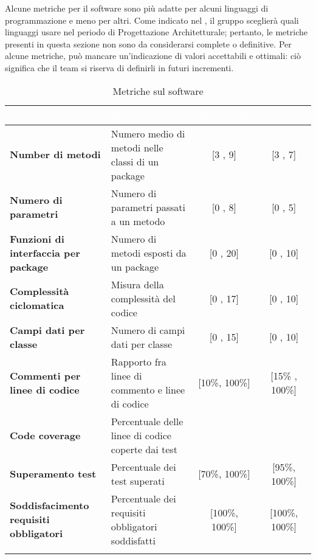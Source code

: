 Alcune metriche per il software sono più adatte per alcuni linguaggi di programmazione e meno per altri. Come indicato nel \PdP , il gruppo \gruppo \space sceglierà quali linguaggi usare nel periodo di Progettazione Architetturale; pertanto, le metriche presenti in questa sezione non sono da considerarsi complete o definitive.\newline
Per alcune metriche, può mancare un'indicazione di valori accettabili e ottimali: ciò significa che il team si riserva di definirli in futuri incrementi.

	\renewcommand{\arraystretch}{1.5}
	\begin{longtable}{C{4cm} C{5cm} c c}
	
	\textcolor{white}{\textbf{Nome}} &
	\textcolor{white}{\textbf{Descrizione}} &
	\textcolor{white}{\textbf{Accettabile}} &
	\textcolor{white}{\textbf{Ottimale}}\\
	\endhead
	\textbf{Number di metodi} &
	Numero medio di metodi nelle classi di un package &
	[3 , 9] &
	[3 , 7]\\
	
	\textbf{Numero di parametri} &
	Numero di parametri passati a un metodo &
	[0 , 8] &
	[0 , 5]\\
	
	\textbf{Funzioni di interfaccia per package} &
	Numero di metodi esposti da un package &
	[0 , 20] &
	[0 , 10]\\
	
	\textbf{Complessità ciclomatica} &
	Misura della complessità del codice &
	[0 , 17] &
	[0 , 10]\\
	
	\textbf{Campi dati per classe} &
	Numero di campi dati per classe &
	[0 , 15] &
	[0 , 10]\\
	
	\textbf{Commenti per linee di codice} &
	Rapporto fra linee di commento e linee di codice &
	[10\%, 100\%] &
	[15\% , 100\%]\\
	
	\textbf{Code coverage} &
	Percentuale delle linee di codice coperte dai test &
	&
	\\
	
	\textbf{Superamento test} &
	Percentuale dei test superati &
	[70\%, 100\%]&
	[95\%, 100\%]\\
	
	\textbf{Soddisfacimento requisiti obbligatori} &
	Percentuale dei requisiti obbligatori soddisfatti &
	[100\%, 100\%]&
	[100\%, 100\%]\\
	
	\caption{Metriche sul software}\\	
	\end{longtable}
	
